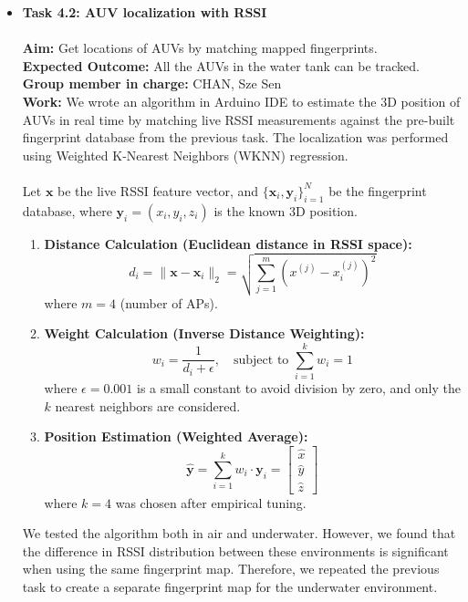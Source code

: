 \documentclass[11pt]{article}
\begin{document}
\begin{itemize}
            \item \textbf{Task 4.2: AUV localization with RSSI}\\\\
            \textbf{Aim:} Get locations of AUVs by matching mapped fingerprints.\\
            \textbf{Expected Outcome:} All the AUVs in the water tank can be tracked.\\
            \textbf{Group member in charge:} CHAN, Sze Sen\\
            \textbf{Work:} We wrote an algorithm in Arduino IDE to estimate the 3D position of AUVs in real time by matching live RSSI measurements against the pre-built fingerprint database from the previous task. The localization was performed using Weighted K-Nearest Neighbors (WKNN) regression.\\\\
            Let $\mathbf{x}$ be the live RSSI feature vector, and $\{\mathbf{x}_i, \mathbf{y}_i\}_{i=1}^{N}$ be the fingerprint database, where $\mathbf{y}_i = (x_i, y_i, z_i)$ is the known 3D position.

        \begin{enumerate}
            \item \textbf{Distance Calculation (Euclidean distance in RSSI space):}
            \begin{equation}
            d_i = \|\mathbf{x} - \mathbf{x}_i\|_2 = \sqrt{\sum_{j=1}^{m} (x^{(j)} - x_i^{(j)})^2}
            \end{equation}
            where $m=4$ (number of APs).
        
            \item \textbf{Weight Calculation (Inverse Distance Weighting):}
            \begin{equation}
            w_i = \frac{1}{d_i + \epsilon}, \quad \text{subject to } \sum_{i=1}^{k} w_i = 1
            \end{equation}
            where $\epsilon = 0.001$ is a small constant to avoid division by zero, and only the $k$ nearest neighbors are considered.
        
            \item \textbf{Position Estimation (Weighted Average):}
            \begin{equation}
            \hat{\mathbf{y}} = \sum_{i=1}^{k} w_i \cdot \mathbf{y}_i = 
            \begin{bmatrix}
            \hat{x} \\
            \hat{y} \\
            \hat{z}
            \end{bmatrix}
            \end{equation}
            where $k=4$ was chosen after empirical tuning.
        \end{enumerate}
        We tested the algorithm both in air and underwater. However, we found that the difference in RSSI distribution between these environments is significant when using the same fingerprint map. Therefore, we repeated the previous task to create a separate fingerprint map for the underwater environment.


        \end{itemize}
\end{document}
